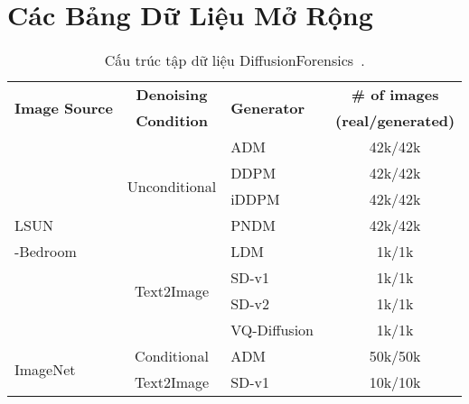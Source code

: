 \appendix

\chapter{Các Bảng Dữ Liệu Mở Rộng}
\label{app:tables}

\begin{table}[ht]
	\centering
	\caption{Cấu trúc tập dữ liệu DiffusionForensics~\cite{Wang2023DIREFD}.}
	\label{tab:diffusionforensics_dataset}
	\begin{adjustbox}{max width=\textwidth}
		\begin{tabular}{lclc}
			\hline
			\multirow{2}{*}{\textbf{Image Source}} & \textbf{Denoising} & \multirow{2}{*}{\textbf{Generator}} & \textbf{\# of images} \\ 
			& \textbf{Condition} & & \textbf{(real/generated)} \\ 
			\hline
			& \multirow{4}{*}{Unconditional} &ADM~\cite{dhariwal2021diffusion} & 42k/42k \\
			& & DDPM~\cite{Ho2020DenoisingDP} & 42k/42k \\
			& & iDDPM~\cite{Nichol2021ImprovedDD} & 42k/42k \\
			LSUN& & PNDM~\cite{Liu2022PseudoNM} & 42k/42k \\ 
			\cline{2-4}
			-Bedroom~\cite{Yu2015LSUNCO} & \multirow{4}{*}{Text2Image} &LDM~\cite{Rombach2021HighResolutionIS} & 1k/1k \\
			& & SD-v1~\cite{Rombach2021HighResolutionIS} & 1k/1k \\
			& & SD-v2~\cite{Rombach2021HighResolutionIS} & 1k/1k \\
			& & VQ-Diffusion~\cite{Gu2021VectorQD} & 1k/1k \\ \hline
			\multirow{2}{*}{ImageNet~\cite{5206848}} & Conditional & ADM~\cite{dhariwal2021diffusion} & 50k/50k \\  \cline{2-4}
			& Text2Image & SD-v1~\cite{Rombach2021HighResolutionIS} & 10k/10k \\
			\hline
		\end{tabular}
	\end{adjustbox}
\end{table}
%
%
%
%

